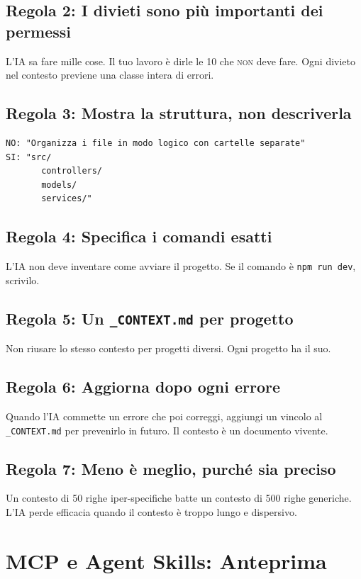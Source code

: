 \subsection*{Regola 2: I divieti sono più importanti dei permessi}
L'IA sa fare mille cose. Il tuo lavoro è dirle le 10 che \textsc{non} deve fare. Ogni divieto nel contesto previene una classe intera di errori.

\subsection*{Regola 3: Mostra la struttura, non descriverla}
\begin{lstlisting}[language={}]
NO: "Organizza i file in modo logico con cartelle separate"
SI: "src/
       controllers/
       models/
       services/"
\end{lstlisting}

\subsection*{Regola 4: Specifica i comandi esatti}
L'IA non deve inventare come avviare il progetto. Se il comando è \texttt{npm run dev}, scrivilo.

\subsection*{Regola 5: Un \texttt{\_CONTEXT.md} per progetto}
Non riusare lo stesso contesto per progetti diversi. Ogni progetto ha il suo.

\subsection*{Regola 6: Aggiorna dopo ogni errore}
Quando l'IA commette un errore che poi correggi, aggiungi un vincolo al \texttt{\_CONTEXT.md} per prevenirlo in futuro. Il contesto è un documento vivente.

\subsection*{Regola 7: Meno è meglio, purché sia preciso}
Un contesto di 50 righe iper-specifiche batte un contesto di 500 righe generiche. L'IA perde efficacia quando il contesto è troppo lungo e dispersivo.

\section{MCP e Agent Skills: Anteprima}

